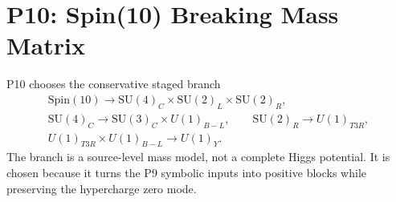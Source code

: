 \documentclass[11pt]{article}
\newcommand{\SU}{\mathrm{SU}}
\newcommand{\Spin}{\mathrm{Spin}}
\begin{document}
\section{P10: Spin(10) Breaking Mass Matrix}

P10 chooses the conservative staged branch
\begin{equation}
\begin{gathered}
  \Spin(10)\to \SU(4)_C\times\SU(2)_L\times\SU(2)_R,\\
  \SU(4)_C\to \SU(3)_C\times U(1)_{B-L},\qquad
  \SU(2)_R\to U(1)_{T3R},\\
  U(1)_{T3R}\times U(1)_{B-L}\to U(1)_Y .
\end{gathered}
\end{equation}
The branch is a source-level mass model, not a complete Higgs potential.  It
is chosen because it turns the P9 symbolic inputs into positive blocks while
preserving the hypercharge zero mode.
\end{document}
